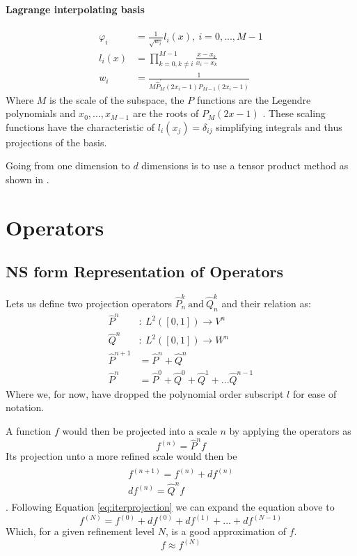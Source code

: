 \documentclass[../master_thesis.tex]{subfiles}
\begin{document}
\paragraph{Lagrange interpolating basis}
  \begin{align}
    \varphi_i &= \frac{1}{\sqrt{w_i}}l_i(x), \ i = 0, ..., M-1\\
    l_i(x) &= \prod^{M-1}_{k = 0, k\neq i} \frac{x-x_k}{x_i-x_k} \\
    w_i &= \frac{1}{M\hat{P}^\prime_M(2x_i-1)P_{M-1}(2x_i-1)}
  \end{align}
Where $M$ is the scale of the subspace, the $P$ functions are the Legendre polynomials and
$x_0, ..., x_{M-1}$ are the roots of $P_M(2x-1)$ \cite{Beylkin:MRA}.
These scaling functions have the characteristic of $l_i(x_j)=\delta_{ij}$ simplifying
integrals and thus projections of the basis.

Going from one dimension to $d$ dimensions is to use a tensor product method as shown in
\cite{Frediani:2013}.
\section{Operators}
\subsection{\ac{NS} form Representation of Operators}\label{NSformsec}
Lets us define two projection operators $\hat{P}^k_n \ \text{and}\ \hat{Q}^k_n $  and their relation as:
\begin{align}
  \hat{P}^n &: \ L^2([0, 1]) \to V^n \\
  \hat{Q}^n &:\  L^2([0, 1]) \to W^n \\
  \hat{P}^{n+1} &= \hat{P}^n + \hat{Q}^n\\
  \hat{P}^n &= \hat{P}^0 + \hat{Q}^0 + \hat{Q}^1 + ...  \hat{Q}^{n-1}\label{eq:iterprojection}
\end{align}
Where we, for now, have dropped the polynomial order subscript $l$ for ease of
notation.

A function $f$ would then be projected into a scale $n$ by applying the
operators as \cite{Frediani:2013}
\begin{equation}
   f^{(n)} = \hat{P}^n f
\end{equation}
Its projection unto a more refined scale would then be \cite{Frediani:2013}
\begin{align}\label{eq:refinef}
  \begin{split}
    f^ {(n+1)} = f^{(n)} + df^{(n)}\\
    df^{(n)} = \hat{Q}^nf
  \end{split}
\end{align}.
Following Equation \ref{eq:iterprojection} we can expand the equation above to
\begin{equation}
  f^{(N)} = f^{(0)} + df^{(0)} + df^{(1)} + ... + df^{(N-1)}
\end{equation}
Which, for a given refinement level $N$, is a good approximation of $f$.
\begin{equation}
  f \approx f^{(N)}
\end{equation}
\end{document}
